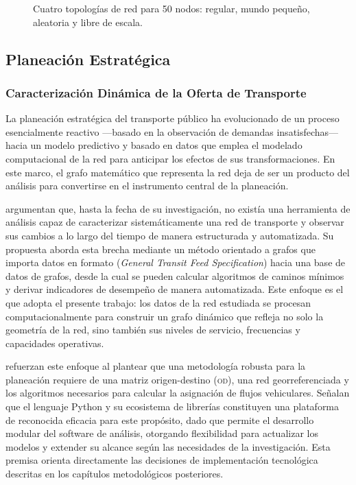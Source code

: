 \begin{figure}[H]
    \centering
   \caption[Topologías de red y vulnerabilidad]{Cuatro topologías de red para
   50 nodos: regular, mundo pequeño, aleatoria y libre de escala.}
   \label{fig:topologias-red}
 \end{figure}

\subsection{Planeación Estratégica}
\label{subsec:planeacion-estrategica}

\subsubsection{Caracterización Dinámica de la Oferta de Transporte}
\label{subsubsec:caracterizacion-dinamica}

La planeación estratégica del transporte público ha evolucionado de un proceso
esencialmente reactivo ---basado en la observación de demandas insatisfechas---
hacia un modelo predictivo y basado en datos que emplea el modelado computacional
de la red para anticipar los efectos de sus transformaciones. En este marco, el grafo
matemático que representa la red deja de ser un producto del análisis para
convertirse en el instrumento central de la planeación.

\textcite{fortin2016innovative} argumentan que, hasta la fecha de su investigación, no existía
una herramienta de análisis capaz de caracterizar sistemáticamente una red de
transporte y observar sus cambios a lo largo del tiempo de manera estructurada y
automatizada. Su propuesta aborda esta brecha mediante un método orientado a
grafos que importa datos en formato \gtfs{} (\textit{General Transit Feed
Specification}) hacia una base de datos de grafos, desde la cual se pueden calcular
algoritmos de caminos mínimos y derivar indicadores de desempeño de manera
automatizada. Este enfoque es el que adopta el presente trabajo: los datos \gtfs{}
de la red estudiada se procesan computacionalmente para construir un grafo dinámico
que refleja no solo la geometría de la red, sino también sus niveles de servicio,
frecuencias y capacidades operativas.

\textcite{moreno2023} refuerzan este enfoque al plantear que una metodología
robusta para la planeación requiere de una matriz origen-destino (\textsc{od}), una
red georreferenciada y los algoritmos necesarios para calcular la asignación de flujos
vehiculares. Señalan que el lenguaje Python y su ecosistema de librerías constituyen
una plataforma de reconocida eficacia para este propósito, dado que permite el
desarrollo modular del software de análisis, otorgando flexibilidad para actualizar los
modelos y extender su alcance según las necesidades de la investigación. Esta
premisa orienta directamente las decisiones de implementación tecnológica descritas
en los capítulos metodológicos posteriores.

